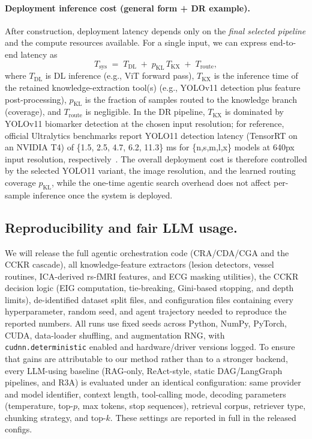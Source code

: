 \documentclass{article}
\begin{document}
\paragraph{Deployment inference cost (general form + DR example).}
After construction, deployment latency depends only on the \emph{final selected pipeline} and the compute resources
available. For a single input, we can express end-to-end latency as
\[
T_{\text{sys}} \;=\; T_{\text{DL}} \;+\; p_{\text{KL}}\,T_{\text{KX}} \;+\; T_{\text{route}},
\]
where $T_{\text{DL}}$ is DL inference (e.g., ViT forward pass), $T_{\text{KX}}$ is the inference time of the retained
knowledge-extraction tool(s) (e.g., YOLOv11 detection plus feature post-processing), $p_{\text{KL}}$ is the fraction of
samples routed to the knowledge branch (coverage), and $T_{\text{route}}$ is negligible. In the DR pipeline, $T_{\text{KX}}$
is dominated by YOLOv11 biomarker detection at the chosen input resolution; for reference, official Ultralytics
benchmarks report YOLO11 detection latency (TensorRT on an NVIDIA T4) of \{1.5, 2.5, 4.7, 6.2, 11.3\} ms for
\{n,s,m,l,x\} models at 640px input resolution, respectively~\cite{yolo11_ultralytics}. The overall deployment cost is
therefore controlled by the selected YOLO11 variant, the image resolution, and the learned routing coverage $p_{\text{KL}}$,
while the one-time agentic search overhead does not affect per-sample inference once the system is deployed.
\subsection{Reproducibility and fair LLM usage.}
We will release the full agentic orchestration code (CRA/CDA/CGA and the CCKR 
cascade), all knowledge-feature extractors (lesion detectors, vessel routines, 
ICA-derived rs-fMRI features, and ECG masking utilities), the CCKR decision logic 
(EIG computation, tie-breaking, Gini-based stopping, and depth limits), 
de-identified dataset split files, and configuration files containing every 
hyperparameter, random seed, and agent trajectory needed to reproduce the reported 
numbers. All runs use fixed seeds across Python, NumPy, PyTorch, CUDA, data-loader 
shuffling, and augmentation RNG, with \texttt{cudnn.deterministic} enabled and 
hardware/driver versions logged. To ensure that gains are attributable to our 
method rather than to a stronger backend, every LLM-using baseline (RAG-only, 
ReAct-style, static DAG/LangGraph pipelines, and R3A) is evaluated under an 
identical configuration: same provider and model identifier, context length, 
tool-calling mode, decoding parameters (temperature, top-$p$, max tokens, stop 
sequences), retrieval corpus, retriever type, chunking strategy, and top-$k$. 
These settings are reported in full in the released configs.
\end{document}
